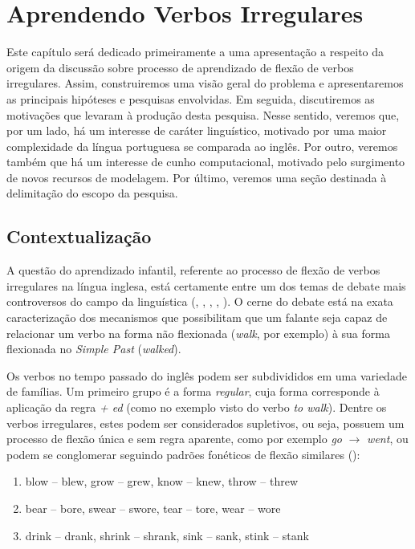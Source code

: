 \chapter{Aprendendo Verbos Irregulares}
\label{ch:01}

Este capítulo será dedicado primeiramente a uma apresentação a respeito da origem da discussão sobre processo de aprendizado de flexão de verbos irregulares.  Assim, construiremos uma visão geral do problema e apresentaremos as principais hipóteses e pesquisas envolvidas. Em seguida, discutiremos as motivações que levaram à produção desta pesquisa. Nesse sentido, veremos que, por um lado, há um interesse de caráter linguístico, motivado por uma maior complexidade da língua portuguesa se comparada ao inglês. Por outro, veremos também que há um interesse de cunho computacional, motivado pelo surgimento de novos recursos de modelagem. Por último, veremos uma seção destinada à delimitação do escopo da pesquisa.

\section{Contextualização}
A questão do aprendizado infantil, referente ao processo de flexão de verbos irregulares na língua inglesa, está certamente entre um dos temas de debate mais controversos  
do campo da linguística (\cite{chomsky:1968}, \cite{Pinker:1999}, \cite{Pinker:1988}, \cite{Albright2003RulesVA}, \cite{kirov:2018}). O cerne do debate está na exata caracterização dos mecanismos que possibilitam que um falante seja capaz de relacionar um verbo na forma não flexionada (\textit{walk}, por exemplo) à sua forma flexionada no \textit{Simple Past} (\textit{walked}).

Os verbos no tempo passado do inglês podem ser subdivididos em uma variedade de famílias. Um primeiro grupo é a forma \textit{regular}, cuja forma corresponde à aplicação da regra \textit{ + ed} (como no exemplo visto do verbo \textit{to walk}). 
Dentre os verbos irregulares, estes podem ser considerados supletivos, ou seja, possuem um processo de flexão única e sem regra aparente, como por exemplo \textit{go} $\rightarrow$ \textit{went}, ou podem se conglomerar seguindo padrões fonéticos de flexão similares (\cite{Nelson:2010}):

\begin{enumerate}
    \item blow – blew, grow – grew, know – knew, throw – threw
    \item bear – bore, swear – swore, tear – tore, wear – wore
    \item drink – drank, shrink – shrank, sink – sank, stink – stank 
\end{enumerate}

